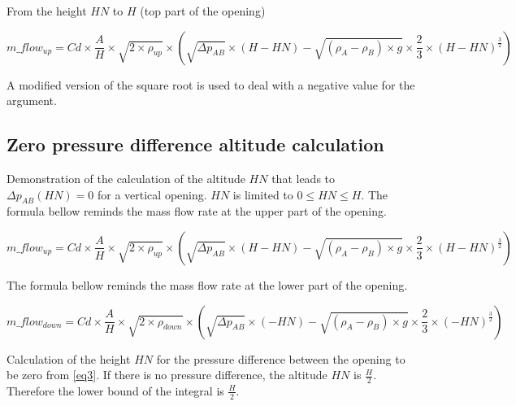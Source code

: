 \documentclass[a4paper, french]{article}
\begin{document}
            From the height $ HN $ to $ H $  (top part of the opening)
            
            \begin{equation} 
            \label{eq10}
                m\_flow_{up} = Cd \times \frac{A}{H} \times \sqrt{ 2 \times \rho_{up}} \times \left( \sqrt{ \Delta {p_{AB}} } \times (H-HN) - \sqrt{ ( \rho_A - \rho_B ) \times g } \times \frac{2}{3} \times {( H - HN)}^\frac{3}{2} \right)
            \end{equation}     
        
            A modified version of the square root is used to deal with a negative value for the argument.
            

        \subsection{Zero pressure difference altitude calculation}
    
            Demonstration of the calculation of the altitude $ HN $ that leads to $ \Delta p_{AB}(HN) = 0 $ for a vertical opening. $ HN $ is limited to $ 0 \leq HN \leq H $.
            The formula bellow reminds the mass flow rate at the upper part of the opening.
            
            \begin{equation*} 
                m\_flow_{up} = Cd \times \frac{A}{H} \times \sqrt{ 2 \times \rho_{up}} \times \left( \sqrt{ \Delta {p_{AB}} } \times (H-HN) - \sqrt{ ( \rho_A - \rho_B ) \times g } \times \frac{2}{3} \times {( H - HN)}^\frac{3}{2} \right)
            \end{equation*} 

            The formula bellow reminds the mass flow rate at the lower part of the opening.

            \begin{equation*} 
                m\_flow_{down} = Cd \times \frac{A}{H} \times \sqrt{ 2 \times \rho_{down}} \times \left( \sqrt{ \Delta {p_{AB}} } \times (- HN) - \sqrt{ ( \rho_A - \rho_B ) \times g } \times \frac{2}{3} \times {(-HN)}^\frac{3}{2} \right)
            \end{equation*} 
            
            Calculation of the height $ HN $ for the pressure difference between the opening to be zero from \eqref{eq3}. If there is no pressure difference, the altitude $ HN $ is $ \frac{H}{2} $. Therefore the lower bound of the integral is $ \frac{H}{2} $.
            
\end{document}
